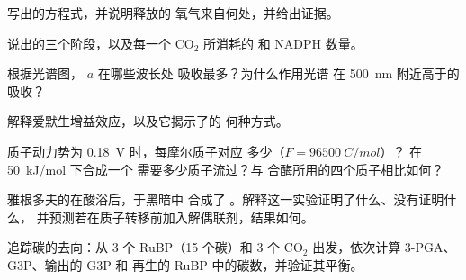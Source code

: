 \begin{exercise}[$\star$]\label{exo:b1:photosynthesis:2}
写出的方程式，并说明释放的
氧气来自何处，并给出证据。
\end{exercise}

\begin{exercise}[$\star$]\label{exo:b1:photosynthesis:3}
说出的三个阶段，以及每一个
$\mathrm{CO_2}$ 所消耗的  和 NADPH 数量。
\end{exercise}

\begin{exercise}[$\star$]\label{exo:b1:photosynthesis:4}
根据光谱图， $a$ 在哪些波长处
吸收最多？为什么作用光谱
在 \qty{500}{nm} 附近高于的吸收？
\end{exercise}

\begin{exercise}[$\star\star$]\label{exo:b1:photosynthesis:5}
解释爱默生增益效应，以及它揭示了的
何种方式。
\end{exercise}

\begin{exercise}[$\star\star$]\label{exo:b1:photosynthesis:6}
质子动力势为 \qty{0.18}{V} 时，每摩尔质子对应
多少（$F = \qty{96500}{C/mol}$）？
在 \qty{50}{kJ/mol} 下合成一个  需要多少质子流过？与
合酶所用的四个质子相比如何？
\end{exercise}

\begin{exercise}[$\star\star$]\label{exo:b1:photosynthesis:7}
雅根多夫的在酸浴后，于黑暗中
合成了 。解释这一实验证明了什么、没有证明什么，
并预测若在质子转移前加入解偶联剂，结果如何。
\end{exercise}

\begin{exercise}[$\star\star$]\label{exo:b1:photosynthesis:8}
追踪碳的去向：从 3 个 RuBP（15 个碳）和 3
个 $\mathrm{CO_2}$ 出发，依次计算 3-PGA、G3P、输出的 G3P 和
再生的 RuBP 中的碳数，并验证其平衡。
\end{exercise}


